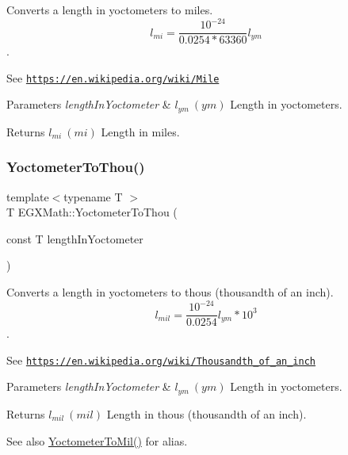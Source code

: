 Converts a length in yoctometers to miles. \[ l_{mi}=\frac{10^{-24}}{0.0254 * 63360} l_{ym} \]. 

See \href{https://en.wikipedia.org/wiki/Mile}{\tt https\+://en.\+wikipedia.\+org/wiki/\+Mile} 
\begin{DoxyParams}{Parameters}
{\em length\+In\+Yoctometer} & $ l_{ym}\ (ym)$ Length in yoctometers. \\
\hline
\end{DoxyParams}
\begin{DoxyReturn}{Returns}
$ l_{mi}\ (mi)$ Length in miles. 
\end{DoxyReturn}
\mbox{\label{group___e_g_x_math-_conversions-_length_conversions-_s_i-_yoctometer-_imperial_ga9c2fbce1711afe0740edd868815ffea1}} 
\subsubsection{\texorpdfstring{Yoctometer\+To\+Thou()}{YoctometerToThou()}}
{\footnotesize\ttfamily template$<$typename T $>$ \\
T E\+G\+X\+Math\+::\+Yoctometer\+To\+Thou (\begin{DoxyParamCaption}\item[{const T}]{length\+In\+Yoctometer }\end{DoxyParamCaption})}



Converts a length in yoctometers to thous (thousandth of an inch). \[ l_{mil}= \frac{10^{-24}}{0.0254} l_{ym} * 10^{3} \]. 

See \href{https://en.wikipedia.org/wiki/Thousandth_of_an_inch}{\tt https\+://en.\+wikipedia.\+org/wiki/\+Thousandth\+\_\+of\+\_\+an\+\_\+inch} 
\begin{DoxyParams}{Parameters}
{\em length\+In\+Yoctometer} & $ l_{ym}\ (ym)$ Length in yoctometers. \\
\hline
\end{DoxyParams}
\begin{DoxyReturn}{Returns}
$ l_{mil}\ (mil)$ Length in thous (thousandth of an inch). 
\end{DoxyReturn}
\begin{DoxySeeAlso}{See also}
\mbox{\hyperlink{group___e_g_x_math-_conversions-_length_conversions-_s_i-_yoctometer-_imperial_gacb2a1154ec79cfd130de96e92dfeedfa}{Yoctometer\+To\+Mil()}} for alias. 
\end{DoxySeeAlso}
\mbox{\label{group___e_g_x_math-_conversions-_length_conversions-_s_i-_yoctometer-_imperial_gaa9c695208d05175797ee88adef7bd5f2}} 
